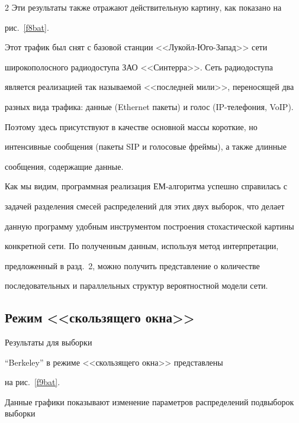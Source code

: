 \begin{multicols}{2}
Эти результаты также отражают действительную картину, как показано на


рис.~\ref{f8bat}.








Этот трафик был снят с базовой станции <<Лукойл-Юго-Запад>> сети


широкополосного радиодоступа ЗАО <<Синтерра>>. Сеть радиодоступа


является реализацией так называемой <<последней мили>>, переносящей два


разных вида трафика: данные (Ethernet пакеты) и голос (IP-телефония, VoIP).


Поэтому здесь присутствуют в качестве основной массы короткие, но


интенсивные сообщения (пакеты SIP и голосовые фреймы), а также длинные


сообщения, содержащие данные.





Как мы видим, программная реализация ЕМ-ал\-го\-рит\-ма успешно справилась с


задачей разделения смесей распределений для этих двух выборок, что делает


данную программу удобным инструментом построения стохастической картины


конкретной сети. По полученным данным, используя метод интерпретации,


предложенный в разд.~2, можно получить представление о количестве


последовательных и параллельных структур вероятностной модели сети.





\subsection{Режим <<скользящего окна>>} %





Результаты для выборки


``Berkeley'' в режиме <<скользящего окна>>  представлены


на рис.~\ref{f9bat}.








Данные графики показывают изменение параметров распределений подвыборок выборки 



\end{multicols}
